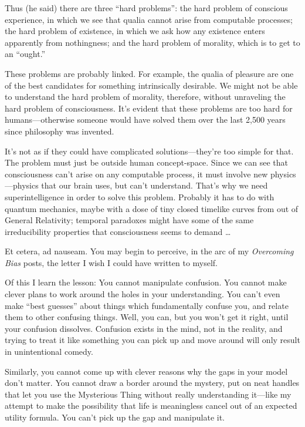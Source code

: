 {
 Thus (he said) there are three ``hard
problems'': the hard problem of conscious experience,
in which we see that qualia cannot arise from computable processes; the
hard problem of existence, in which we ask how any existence enters
apparently from nothingness; and the hard problem of morality, which is
to get to an ``ought.''}

{
 These problems are probably linked. For example, the qualia of
pleasure are one of the best candidates for something intrinsically
desirable. We might not be able to understand the hard problem of
morality, therefore, without unraveling the hard problem of
consciousness. It's evident that these problems are too
hard for humans---otherwise someone would have solved them over the
last 2,500 years since philosophy was invented.}

{
 It's not as if they could have complicated
solutions---they're too simple for that. The problem
must just be outside human concept-space. Since we can see that
consciousness can't arise on any computable process, it
must involve new physics---physics that our brain uses, but
can't understand. That's why we need
superintelligence in order to solve this problem. Probably it has to do
with quantum mechanics, maybe with a dose of tiny closed timelike
curves from out of General Relativity; temporal paradoxes might have
some of the same irreducibility properties that consciousness seems to
demand \ldots}

{
 Et cetera, ad nauseam. You may begin to perceive, in the arc of my
\textit{Overcoming Bias} posts, the letter I wish I could have written
to myself.}

{
 Of this I learn the lesson: You cannot manipulate confusion. You
cannot make clever plans to work around the holes in your
understanding. You can't even make
``best guesses'' about things which
fundamentally confuse you, and relate them to other confusing things.
Well, you can, but you won't get it right, until your
confusion dissolves. Confusion exists in the mind, not in the reality,
and trying to treat it like something you can pick up and move around
will only result in unintentional comedy.}

{
 Similarly, you cannot come up with clever reasons why the gaps in
your model don't matter. You cannot draw a border
around the mystery, put on neat handles that let you use the Mysterious
Thing without really understanding it---like my attempt to make the
possibility that life is meaningless cancel out of an expected utility
formula. You can't pick up the gap and manipulate it.}

